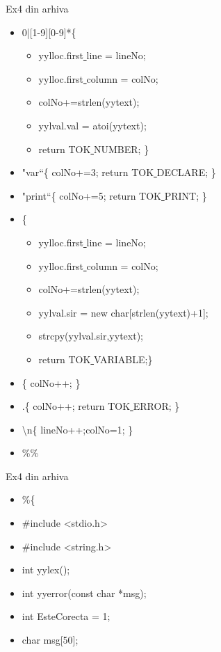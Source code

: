 \documentclass[pdf]{beamer}
\begin{document}
\begin{frame}{Ex4 din arhiva}
\begin{itemize}
\item
0|[1-9][0-9]*\hspace{7.5mm}\{ 
\begin{itemize}
\item
yylloc.first\underline{ }line = lineNo; 
\item
yylloc.first\underline{ }column = colNo; 
\item
colNo+=strlen(yytext);
\item
yylval.val = atoi(yytext);
\item
return TOK\underline{ }NUMBER; \}
\end{itemize}
\item
"var“\hspace{19mm}\{ colNo+=3; return TOK\underline{ }DECLARE; \}
\item
"print“\hspace{16.2mm}\{ colNo+=5; return TOK\underline{ }PRINT; \}
\item
\text{[a-zA-Z][a-zA-Z0-9]*} \{ 
\begin{itemize}
\item
yylloc.first\underline{ }line = lineNo;
\item
yylloc.first\underline{ }column = colNo; 
\item
colNo+=strlen(yytext); 
\item
yylval.sir = new char[strlen(yytext)+1];
\item 
strcpy(yylval.sir,yytext); 
\item
return TOK\underline{ }VARIABLE;\}
\end{itemize}
\item
\text{[ ]}\hspace{24.5mm}\{ colNo++; \} 
\item
.\hspace{26.5mm}\{ colNo++; return TOK\underline{ }ERROR; \}
\item
\textbackslash{n}\hspace{24mm}\{ lineNo++;colNo=1; \}
\item
\%\%

\end{itemize}
\end{frame}



\begin{frame}{Ex4 din arhiva}
\begin{itemize}
\item
\%\{
\item \qquad
\#include <stdio.h>
\item \qquad
\#include <string.h>
\item \qquad \vspace{5mm}
int yylex();
\item \qquad
int yyerror(const char *msg);
\item \qquad \vspace{5mm}
int EsteCorecta = 1;
\item \qquad
char msg[50];

\end{itemize}
\end{frame}
\end{document}
